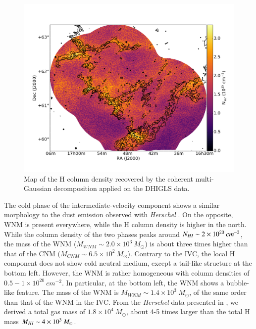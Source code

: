 \documentclass[traditabstract]{aa}
\begin{document}
\begin{figure}[h!]
  \centering
  \includegraphics[width=0.8\linewidth,trim=45 55 65 105,clip=true]{Figures/DHIGLS_NHI_tot.png}
  \caption{\label{NHI_DHIGLS} Map of the H column density recovered by the coherent multi-Gaussian decomposition applied on the DHIGLS data.}
\end{figure}

   The cold phase of the intermediate-velocity component shows a similar morphology to the dust emission observed with \emph{Herschel} \citep{MAMD_2017b}. On the opposite, WNM is present everywhere, while the H column density is higher in the north. While the column density of the two phases peaks around $N_{H\rmnum{1}}\sim 2\times 10^{20}\: cm^{-2}$, the mass of the WNM ($M_{WNM}\sim 2.0\times 10^3\: M_\odot$) is about three times higher than that of the CNM ($M_{CNM}\sim 6.5\times 10^2\: M_\odot$).
Contrary to the IVC, the local H component does not show cold neutral medium, except a tail-like structure at the bottom left. However, the WNM is rather homogeneous with column densities of $0.5-1\times 10^{20}\: cm^{-2}$. In particular, at the bottom left, the WNM shows a bubble-like feature. The mass of the WNM is $M_{WNM}\sim 1.4\times 10^3\: M_\odot$, of the same order than that of the WNM in the IVC.
From the \emph{Herschel} data presented in \cite{MAMD_2017b}, we derived a total gas mass of $1.8\times 10^4\: M_\odot$, about 4-5 times larger than the total H mass $M_{H\rmnum{1}}\sim 4\times 10^3\: M_\odot$.
\end{document}
